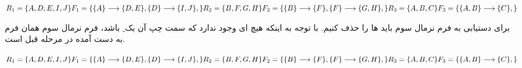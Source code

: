 \documentclass{article}
\begin{document}
\begin{latin}
$
\\
R_{1}=\{A, D, E, I, J\}\\
F_{1}=\\
\{\\
\{A\}\longrightarrow\{D, E\},\\
\{D\}\longrightarrow\{I, J\},\\
\}
\\
\\
R_{2}=\{B, F, G, H\}\\
F_{2}=\\
\{\\
\{B\}\longrightarrow\{F\},\\
\{F\}\longrightarrow\{G, H\},\\
\}
\\
\\
R_{3}=\{A, B, C\}\\
F_{3}=\\
\{\\
\{A, B\}\longrightarrow\{C\},\\
\}
$
\end{latin}
برای دستیابی به فرم نرمال سوم باید ها را حذف کنیم. با توجه به اینکه هیچ ای وجود ندارد که سمت چپ آن یک ِ  باشد، فرم نرمال سوم همان فرم به دست آمده در مرحله قبل است.
\begin{latin}
$
\\
R_{1}=\{A, D, E, I, J\}\\
F_{1}=\\
\{\\
\{A\}\longrightarrow\{D, E\},\\
\{D\}\longrightarrow\{I, J\},\\
\}
\\
\\
R_{2}=\{B, F, G, H\}\\
F_{2}=\\
\{\\
\{B\}\longrightarrow\{F\},\\
\{F\}\longrightarrow\{G, H\},\\
\}
\\
\\
R_{3}=\{A, B, C\}\\
F_{3}=\\
\{\\
\{A, B\}\longrightarrow\{C\},\\
\}
$
\end{latin}
\end{document}

